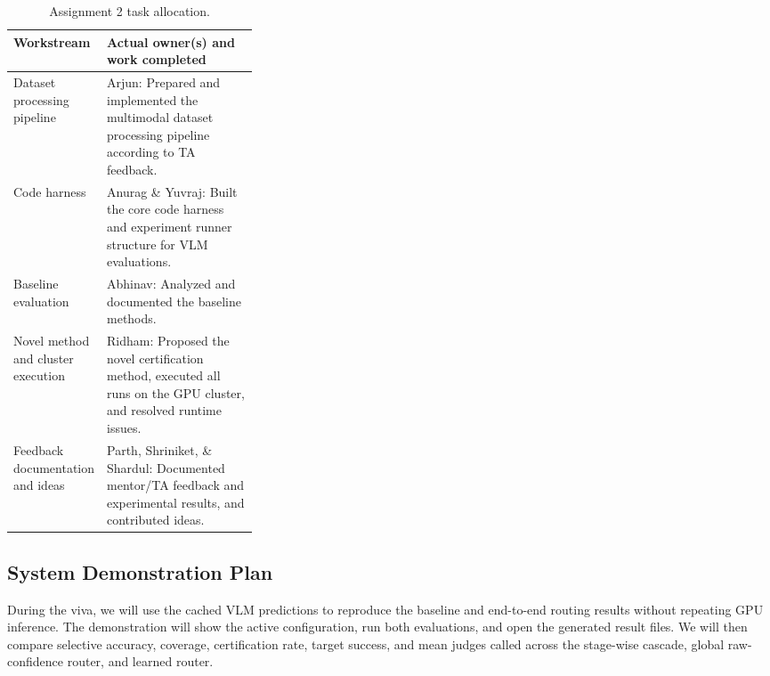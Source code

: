 \documentclass[11pt]{article}
\begin{document}
\begin{table}[t]
\centering
\small
\begin{tabularx}{\linewidth}{p{0.32\linewidth} Y}
\toprule
\textbf{Workstream} & \textbf{Actual owner(s) and work completed} \\
\midrule
Dataset processing pipeline & Arjun: Prepared and implemented the multimodal dataset processing pipeline according to TA feedback. \\
Code harness & Anurag \& Yuvraj: Built the core code harness and experiment runner structure for VLM evaluations. \\
Baseline evaluation & Abhinav: Analyzed and documented the baseline methods. \\
Novel method and cluster execution & Ridham: Proposed the novel certification method, executed all runs on the GPU cluster, and resolved runtime issues. \\
Feedback documentation and ideas & Parth, Shriniket, \& Shardul: Documented mentor/TA feedback and experimental results, and contributed ideas. \\
\bottomrule
\end{tabularx}
\caption{Assignment 2 task allocation.}
\label{tab:task-allocation}
\end{table}


\subsection{System Demonstration Plan}

During the viva, we will use the cached VLM predictions to reproduce the
baseline and end-to-end routing results without repeating GPU inference. The
demonstration will show the active configuration, run both evaluations, and
open the generated result files. We will then compare selective accuracy,
coverage, certification rate, target success, and mean judges called across
the stage-wise cascade, global raw-confidence router, and learned router.
\end{document}
